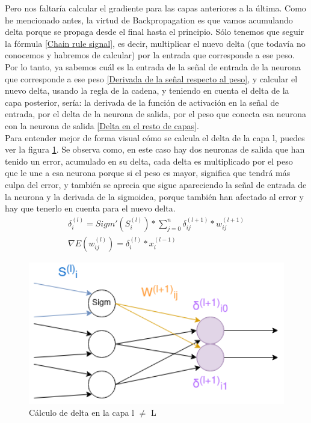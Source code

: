 Pero nos faltaría calcular el gradiente para las capas anteriores a la última. Como he mencionado antes, la virtud de Backpropagation es que vamos acumulando delta porque se propaga desde el final hasta el principio. Sólo tenemos que seguir la fórmula \ref{Chain rule signal}, es decir, multiplicar el nuevo delta (que todavía no conocemos y habremos de calcular) por la entrada que corresponde a ese peso. 
\\
Por lo tanto, ya sabemos cuál es la entrada de la señal  de entrada de la neurona que corresponde a ese peso \ref{Derivada de la señal respecto al peso}, y calcular el nuevo delta, usando la regla de la cadena, y teniendo en cuenta el delta de la capa posterior, sería: la derivada de la función de activación en la señal de entrada, por el delta de la neurona de salida, por el peso que conecta esa neurona con la neurona de salida \ref{Delta en el resto de capas}. 
\\
Para entender mejor de forma visual cómo se calcula el delta de la capa l, puedes ver la figura \ref{Delta en la capa l}. Se observa como, en este caso hay dos neuronas de salida que han tenido un error, acumulado en su delta, cada delta es multiplicado por el peso que le une a esa neurona porque si el peso es mayor, significa que tendrá más culpa del error, y también se aprecia que sigue apareciendo la señal de entrada de la neurona y la derivada de la sigmoidea, porque también han afectado al error y hay que tenerlo en cuenta para el nuevo delta.
\begin{subequations}
	\begin{eqnarray}
		\delta_{i}^{(l)} = Sigm'(S_{i}^{(l)}) * \sum_{j=0}^{n} \delta_{ij}^{(l+1)} * w_{ij}^{(l+1)} \label{Delta en el resto de capas} \\
		\nabla E(w_{ij}^{(l)}) = \delta_{i}^{(l)}  * x_{i}^{(l-1)} \label{Gradiente para las neuronas del resto de capas}
	\end{eqnarray}
\end{subequations}

\begin{figure}[H]
	\centering
	\includegraphics[width=15cm]{archivos/imagenes/Calculo-del-delta-en-la-capa-l.png}
	\caption{Cálculo de delta en la capa l $\neq$ L}
	\label{Delta en la capa l}
\end{figure}

